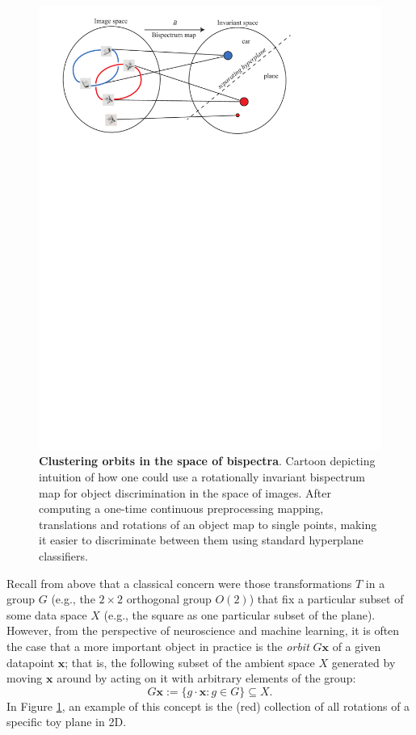 \documentclass[letterpaper, 10pt]{article}
\theoremstyle{definition}
\begin{document}
\begin{figure}
 \begin{center}
  \includegraphics[width=.8 \linewidth]{figs/bispectrum2.pdf} 
\caption{\textbf{Clustering orbits in the space of bispectra}. Cartoon depicting intuition of how one could use a rotationally invariant bispectrum map for object discrimination in the space of images.  After computing a one-time continuous preprocessing mapping, translations and rotations of an object map to single points, making it easier to discriminate between them using standard hyperplane classifiers.}
\label{bispetrum_intuition}
\end{center}
\end{figure}

Recall from above that a classical concern were those transformations $T$ in a group $G$ (e.g., the $2 \times 2$ orthogonal group $O(2)$) that fix a particular subset of some data space $X$ (e.g., the square as one particular subset of the plane). %
However, from the perspective of neuroscience and machine learning, it is often the case that a more important object in practice is the \textit{orbit} $G\mathbf{x}$ of a given datapoint $\mathbf{x}$; that is, the following subset of the ambient space $X$ generated by moving $\mathbf{x}$ around by acting on it with arbitrary elements of the group:  
\[ G\mathbf{x} := \{g\cdot \mathbf{x}: g \in G\} \subseteq X.\]
In Figure \ref{bispetrum_intuition}, an example of this concept is the (red) collection of all rotations of a specific toy plane in 2D.
\end{document}
